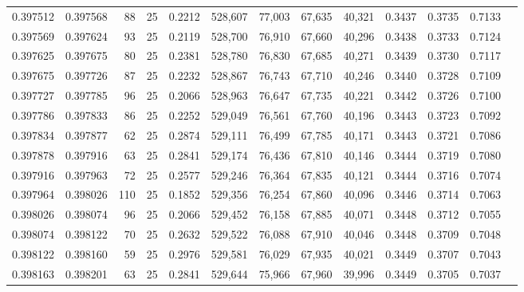 \begin{tabular}{rrrrrrrrrrrrr}
0.397512 & 0.397568 &    88 &  25 &                                     0.2212 & 528,607 &  77,003 &  67,635 &  40,321 & 0.3437 & 0.3735 & 0.7133 \\
0.397569 & 0.397624 &    93 &  25 &                                     0.2119 & 528,700 &  76,910 &  67,660 &  40,296 & 0.3438 & 0.3733 & 0.7124 \\
0.397625 & 0.397675 &    80 &  25 &                                     0.2381 & 528,780 &  76,830 &  67,685 &  40,271 & 0.3439 & 0.3730 & 0.7117 \\
0.397675 & 0.397726 &    87 &  25 &                                     0.2232 & 528,867 &  76,743 &  67,710 &  40,246 & 0.3440 & 0.3728 & 0.7109 \\
0.397727 & 0.397785 &    96 &  25 &                                     0.2066 & 528,963 &  76,647 &  67,735 &  40,221 & 0.3442 & 0.3726 & 0.7100 \\
0.397786 & 0.397833 &    86 &  25 &                                     0.2252 & 529,049 &  76,561 &  67,760 &  40,196 & 0.3443 & 0.3723 & 0.7092 \\
0.397834 & 0.397877 &    62 &  25 &                                     0.2874 & 529,111 &  76,499 &  67,785 &  40,171 & 0.3443 & 0.3721 & 0.7086 \\
0.397878 & 0.397916 &    63 &  25 &                                     0.2841 & 529,174 &  76,436 &  67,810 &  40,146 & 0.3444 & 0.3719 & 0.7080 \\
0.397916 & 0.397963 &    72 &  25 &                                     0.2577 & 529,246 &  76,364 &  67,835 &  40,121 & 0.3444 & 0.3716 & 0.7074 \\
0.397964 & 0.398026 &   110 &  25 &                                     0.1852 & 529,356 &  76,254 &  67,860 &  40,096 & 0.3446 & 0.3714 & 0.7063 \\
0.398026 & 0.398074 &    96 &  25 &                                     0.2066 & 529,452 &  76,158 &  67,885 &  40,071 & 0.3448 & 0.3712 & 0.7055 \\
0.398074 & 0.398122 &    70 &  25 &                                     0.2632 & 529,522 &  76,088 &  67,910 &  40,046 & 0.3448 & 0.3709 & 0.7048 \\
0.398122 & 0.398160 &    59 &  25 &                                     0.2976 & 529,581 &  76,029 &  67,935 &  40,021 & 0.3449 & 0.3707 & 0.7043 \\
0.398163 & 0.398201 &    63 &  25 &                                     0.2841 & 529,644 &  75,966 &  67,960 &  39,996 & 0.3449 & 0.3705 & 0.7037 \\

\end{tabular}
